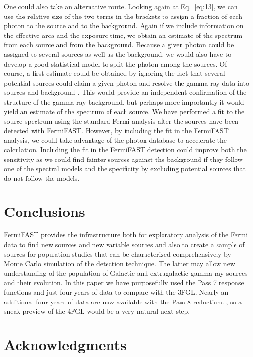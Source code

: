 \documentclass[useAMS,usenatbib]{mn2e}
\begin{document}
One could also take an alternative route.  Looking again at
Eq.~\ref{eq:13}, we can use the relative size of the two terms in the
brackets to assign a fraction of each photon to the source and to the
background.  Again if we include information on the effective area and
the exposure time, we obtain an estimate of the spectrum from each
source and from the background.  Because a given photon could be
assigned to several sources as well as the background, we would also
have to develop a good statistical model to split the photon among the
sources.  Of course, a first estimate could be obtained by ignoring
the fact that several potential sources could claim a given photon and
resolve the gamma-ray data into sources and background \citep[as done
 by][]{2015A&A...581A.126S}. This would provide an independent
confirmation of the structure of the gamma-ray background, but perhaps
more importantly it would yield an estimate of the spectrum of each
source. We have performed a fit to the source spectrum using the
standard Fermi analysis after the sources have been detected with
FermiFAST.  However, by including the fit in the FermiFAST analysis,
we could take advantage of the photon database to accelerate the
calculation.  Including the fit in the FermiFAST detection could
improve both the sensitivity as we could find fainter sources against
the background if they follow one of the spectral models and the
specificity by excluding potential sources that do not follow the
models.

\section{Conclusions}
\label{sec:conclusions}

FermiFAST provides the infrastructure both for exploratory analysis of
the Fermi data to find new sources and new variable sources and also
to create a sample of sources for population studies that can be
characterized comprehensively by Monte Carlo simulation of the
detection technique.  The latter may allow new understanding of the
population of Galactic and extragalactic gamma-ray sources and their
evolution. In this paper we have purposefully used the Pass 7 response
functions and just four years of data to compare with the 3FGL.
Nearly an additional four years of data are now available with the
Pass 8 reductions \citep{2013arXiv1303.3514A}, so a sneak preview of
the 4FGL would be a very natural next step.

\section*{Acknowledgments}
\end{document}
